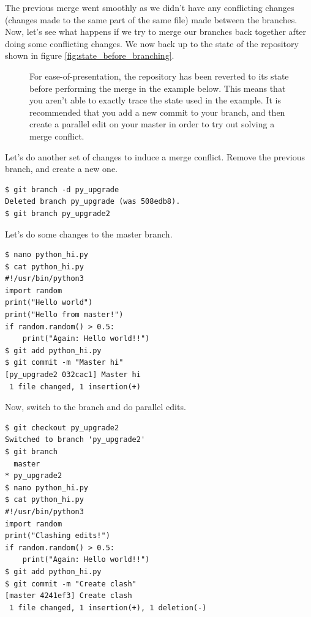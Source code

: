 \documentclass[../main/git_course_main.tex]{subfiles}
\begin{document}
The previous merge went smoothly as we didn't have any conflicting changes (changes made to the same part of the same file) made between the branches. Now, let's see what happens if we try to merge our branches back together after doing some conflicting changes. We now back up to the state of the repository shown in figure \ref{fig:state_before_branching}.

\begin{figure}[h!]
\begin{redbox}
For ease-of-presentation, the repository has been reverted to its state before performing the merge in the example below. This means that you aren't able to exactly trace the state used in the example. It is recommended that you add a new commit to your branch, and then create a parallel edit on your master in order to try out solving a merge conflict.
\end{redbox}
\end{figure}

Let's do another set of changes to induce a merge conflict. Remove the previous branch, and create a new one.

\begin{codebox}
\begin{lstlisting}
$ git branch -d py_upgrade
Deleted branch py_upgrade (was 508edb8).
$ git branch py_upgrade2
\end{lstlisting}
\end{codebox}

Let's do some changes to the master branch.

\begin{codebox}
\begin{lstlisting}
$ nano python_hi.py
$ cat python_hi.py
#!/usr/bin/python3
import random
print("Hello world")
print("Hello from master!")
if random.random() > 0.5:
    print("Again: Hello world!!")
$ git add python_hi.py
$ git commit -m "Master hi"
[py_upgrade2 032cac1] Master hi
 1 file changed, 1 insertion(+)
\end{lstlisting}
\end{codebox}

Now, switch to the branch and do parallel edits.

\begin{codebox}
\begin{lstlisting}
$ git checkout py_upgrade2
Switched to branch 'py_upgrade2'
$ git branch
  master
* py_upgrade2
$ nano python_hi.py
$ cat python_hi.py
#!/usr/bin/python3
import random
print("Clashing edits!")
if random.random() > 0.5:
    print("Again: Hello world!!")
$ git add python_hi.py
$ git commit -m "Create clash"
[master 4241ef3] Create clash
 1 file changed, 1 insertion(+), 1 deletion(-)
\end{lstlisting}
\end{codebox}
\end{document}
